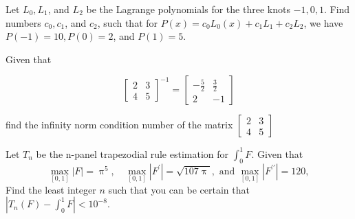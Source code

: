 \documentclass[12pt,fleqn]{exam}
\newcommand{\integers}{\mathbf{Z}}
\begin{document}
\begin{questions}



\question [5] Let \(L_0, L_1\), and \(L_2\) be the  Lagrange polynomials for the three knots \(-1,0,1\).  Find numbers \(c_0, c_1\), and \(c_2\), such that  for \(P(x) = c_0 L_0(x) + c_1 L_1 + c_2 L_2\),
we have \(P(-1)  = 10, P(0) = 2\), and  \(P(1) = 5\).

\begin{solution}%

\end{solution}



\question Given that 


\[
\begin{bmatrix}2 & 3\\
4 & 5\end{bmatrix}^{-1} = \begin{bmatrix}-\frac{5}{2} & \frac{3}{2}\\ 2 & -1\end{bmatrix}\]



find the infinity norm condition number of the matrix \(\begin{bmatrix}2 & 3\\
4 & 5\end{bmatrix} \)






\question Let $T_n$ be the n-panel trapezodial rule estimation for $\int_0^1 F$. Given that
\begin{equation*}
    \underset{[0,1]}{\max} | F |  = \uppi^5, \quad   \underset{[0,1]}{\max} | F^\prime |  = \sqrt{107 \uppi}, \text{ and }   \underset{[0,1]}{\max} | F^{\prime \prime} |  = 120,
\end{equation*}
Find the least integer $n$ such that you can be certain that  $| T_n(F) - \int_0^1 F | < 10^{-8}$.

\end{questions}
\end{document}
